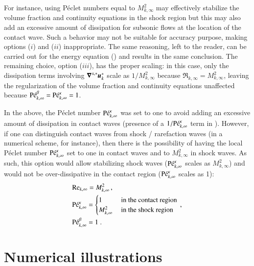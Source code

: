 For instance, using P\'eclet numbers equal to $M_{k,\infty}^2$ may effectively stabilize the volume fraction and continuity 
equations in the shock region but this may also add an excessive amount of dissipation for subsonic 
flows at the location of the contact wave. Such a behavior may not be suitable for accuracy purpose, 
making options ($i$) and ($ii$) inappropriate. The same reasoning, left to the reader, can be carried out 
for the energy equation () and results in the same conclusion. The remaining 
choice, option ($iii$), has the proper scaling: in this case, only the dissipation terms involving 
$\boldsymbol\nabla^{s,*} \boldsymbol u_k^*$ scale as $1/M_{k,\infty}^2$ because $\Re_{k,\infty} = M_{k,\infty}^2$, leaving the 
regularization of the volume fraction and continuity equations unaffected because $\textrm{P\'e}_{k,\infty}^\beta = \textrm{P\'e}_{k,\infty}^\kappa =1$.
%
\begin{my_remark}
In the above, the P\'eclet number $\textrm{P\'e}_{k,\infty}^\kappa$ was set to one to avoid adding an excessive amount of dissipation in contact waves
(presence of a $1/\textrm{P\'e}_{k,\infty}^\kappa$ term in ). 
However, if one can distinguish contact waves from shock / rarefaction waves (in a numerical scheme, for instance), then there is the possibility of 
having the local P\'eclet number $\textrm{P\'e}_{k,\infty}^\kappa$ set to one in contact waves and to $M^2_{k,\infty}$ in shock waves. 
As such, this option would allow stabilizing shock waves ($\textrm{P\'e}_{k,\infty}^\kappa$ scales as $M^2_{k,\infty}$) and would not be over-dissipative in the 
contact region ($\textrm{P\'e}_{k,\infty}^\kappa$ scales as 1):
%
\begin{align}
&\textrm{Re}_{k,\infty} = M_{k,\infty}^2 \,, \nonumber \\ 
& \textrm{P\'e}_{k,\infty}^\kappa = 
\begin{cases} 
1              & \text{ in the contact region} \\
M^2_{k,\infty} & \text{ in the shock region } 
\end{cases} \,,\nonumber \\ 
&\textrm{P\'e}_{k,\infty}^\beta = 1 \ . \nonumber
\end{align}
%
\end{my_remark}
%
\section{Numerical illustrations}\label{sec:num-ill}

